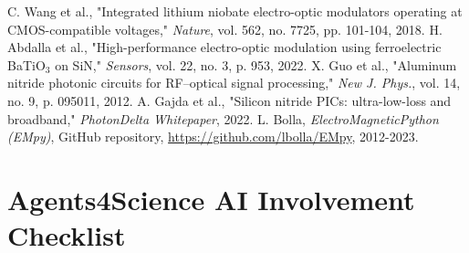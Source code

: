 \documentclass{article}
\begin{document}
\begin{thebibliography}{99}
C. Wang et al., "Integrated lithium niobate electro-optic modulators operating at CMOS-compatible voltages," \textit{Nature}, vol. 562, no. 7725, pp. 101-104, 2018.
H. Abdalla et al., "High-performance electro-optic modulation using ferroelectric BaTiO$_3$ on SiN," \textit{Sensors}, vol. 22, no. 3, p. 953, 2022.
X. Guo et al., "Aluminum nitride photonic circuits for RF–optical signal processing," \textit{New J. Phys.}, vol. 14, no. 9, p. 095011, 2012.
A. Gajda et al., "Silicon nitride PICs: ultra-low-loss and broadband," \textit{PhotonDelta Whitepaper}, 2022.
L. Bolla, \textit{ElectroMagneticPython (EMpy)}, GitHub repository, \url{https://github.com/lbolla/EMpy}, 2012-2023.
\end{thebibliography}

\appendix
\newpage
\section*{Agents4Science AI Involvement Checklist}
\end{document}
